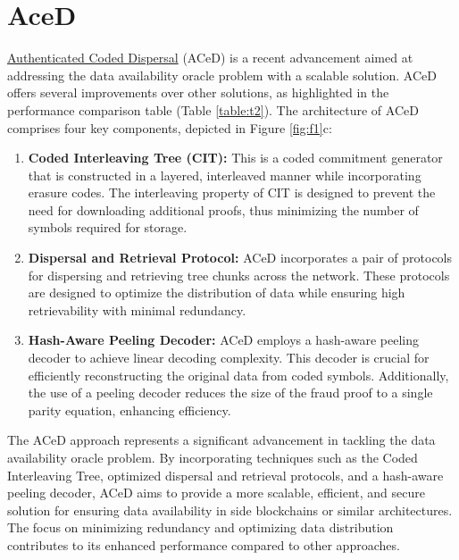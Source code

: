 \documentclass{report}
\begin{document}
\section{AceD}
\href{https://arxiv.org/abs/2011.00102}{Authenticated Coded Dispersal} (ACeD) is a recent advancement aimed at addressing the data availability oracle problem with a scalable solution. ACeD offers several improvements over other solutions, as highlighted in the performance comparison table (Table \ref{table:t2}). The architecture of ACeD comprises four key components, depicted in Figure \ref{fig:f1}c:
\begin{enumerate}
	\item \textbf{Coded Interleaving Tree (CIT):} This is a coded commitment generator that is constructed in a layered, interleaved manner while incorporating erasure codes. The interleaving property of CIT is designed to prevent the need for downloading additional proofs, thus minimizing the number of symbols required for storage.
	\item \textbf{Dispersal and Retrieval Protocol:} ACeD incorporates a pair of protocols for dispersing and retrieving tree chunks across the network. These protocols are designed to optimize the distribution of data while ensuring high retrievability with minimal redundancy.
	\item \textbf{Hash-Aware Peeling Decoder:} ACeD employs a hash-aware peeling decoder to achieve linear decoding complexity. This decoder is crucial for efficiently reconstructing the original data from coded symbols. Additionally, the use of a peeling decoder reduces the size of the fraud proof to a single parity equation, enhancing efficiency.
\end{enumerate}
The ACeD approach represents a significant advancement in tackling the data availability oracle problem. By incorporating techniques such as the Coded Interleaving Tree, optimized dispersal and retrieval protocols, and a hash-aware peeling decoder, ACeD aims to provide a more scalable, efficient, and secure solution for ensuring data availability in side blockchains or similar architectures. The focus on minimizing redundancy and optimizing data distribution contributes to its enhanced performance compared to other approaches.
\end{document}
